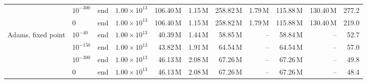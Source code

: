 {\begin{tabular}{@{}llllrrrrrrr@{}}
 & $10^{-300}$ & end & $1.00\times10^{13}$ & 106.40\,M & 1.15\,M & 258.82\,M & 1.79\,M & 115.88\,M & 130.40\,M & 277.2 \\
 & $0$ & end & $1.00\times10^{13}$ & 106.40\,M & 1.15\,M & 258.82\,M & 1.79\,M & 115.88\,M & 130.40\,M & 219.0 \\
\addlinespace[2pt]
Adams, fixed point & $10^{-40}$ & end & $1.00\times10^{13}$ & 40.39\,M & 1.44\,M & 58.85\,M & -- & 58.84\,M & -- & 52.7 \\
 & $10^{-150}$ & end & $1.00\times10^{13}$ & 43.82\,M & 1.91\,M & 64.54\,M & -- & 64.54\,M & -- & 57.0 \\
 & $10^{-300}$ & end & $1.00\times10^{13}$ & 46.13\,M & 2.08\,M & 67.26\,M & -- & 67.26\,M & -- & 49.8 \\
 & $0$ & end & $1.00\times10^{13}$ & 46.13\,M & 2.08\,M & 67.26\,M & -- & 67.26\,M & -- & 48.4 \\
\bottomrule
\end{tabular}}
